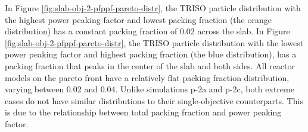 In Figure \ref{fig:slab-obj-2-pfppf-pareto-distr}, the TRISO particle distribution with the 
highest power peaking factor and lowest packing fraction (the orange distribution) has 
a constant packing fraction of 0.02 across the slab. 
In Figure \ref{fig:slab-obj-2-pfppf-pareto-distr}, the TRISO particle distribution with the 
lowest power peaking factor and highest packing fraction (the blue distribution), has 
a packing fraction that peaks in the center of the slab and both sides. 
All reactor models on the pareto front have a relatively flat packing fraction 
distribution, varying between 0.02 and 0.04. 
Unlike simulations p-2a and p-2c, both extreme cases do not have similar distributions to their 
single-objective counterparts. 
This is due to the relationship between total packing fraction and power peaking factor. 

